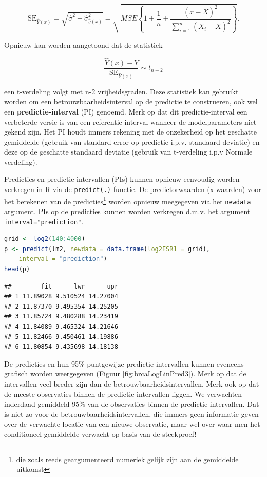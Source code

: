 \documentclass[
  12pt,dutch,coursenotes]{book}
\newcommand{\passthrough}[1]{#1}
\begin{document}
\[\text{SE}_{\hat{Y}(x)}=\sqrt{\hat\sigma^2+\hat\sigma^2_{\hat{g}(x)}}=\sqrt{MSE\left\{1+\frac{1}{n}+\frac{(x-\bar X)^2}{\sum\limits_{i=1}^n (X_i-\bar X)^2}\right\}}.\]

Opnieuw kan worden aangetoond dat de statistiek

\[\frac{\hat{Y}(x)-Y}{\text{SE}_{\hat{Y}(x)}}\sim t_{n-2}\]

een t-verdeling volgt met n-2 vrijheidsgraden.
Deze statistiek kan gebruikt worden om een betrouwbaarheidsinterval op de predictie te construeren, ook wel een \textbf{predictie-interval} (PI) genoemd.
Merk op dat dit predictie-interval een verbeterde versie is van een referentie-interval wanneer de modelparameters niet gekend zijn. Het PI houdt immers rekening met de onzekerheid op het geschatte gemiddelde (gebruik van standard error op predictie i.p.v. standaard deviatie) en deze op de geschatte standaard deviatie (gebruik van t-verdeling i.p.v Normale verdeling).

Predicties en predictie-intervallen (PIs) kunnen opnieuw eenvoudig worden verkregen in R via de \passthrough{\lstinline!predict(.)!} functie.
De predictorwaarden (x-waarden) voor het berekenen van de predicties\footnote{die zoals reeds geargumenteerd numeriek gelijk zijn aan de gemiddelde uitkomst} worden opnieuw meegegeven via het \passthrough{\lstinline!newdata!} argument.
PIs op de predicties kunnen worden verkregen d.m.v. het argument \passthrough{\lstinline!interval="prediction"!}.

\begin{lstlisting}[language=R]
grid <- log2(140:4000)
p <- predict(lm2, newdata = data.frame(log2ESR1 = grid),
    interval = "prediction")
head(p)
\end{lstlisting}

\begin{lstlisting}
##        fit      lwr      upr
## 1 11.89028 9.510524 14.27004
## 2 11.87370 9.495354 14.25205
## 3 11.85724 9.480288 14.23419
## 4 11.84089 9.465324 14.21646
## 5 11.82466 9.450461 14.19886
## 6 11.80854 9.435698 14.18138
\end{lstlisting}

De predicties en hun 95\% puntgewijze predictie-intervallen kunnen eveneens grafisch worden weergegeven (Figuur \ref{fig:brcaLogLinPred3}).
Merk op dat de intervallen veel breder zijn dan de betrouwbaarheidsintervallen.
Merk ook op dat de meeste observaties binnen de predictie-intervallen liggen.
We verwachten inderdaad gemiddeld 95\% van de observaties binnen de predictie-intervallen.
Dat is niet zo voor de betrouwbaarheidsintervallen, die immers geen informatie geven over de verwachte locatie van een nieuwe observatie, maar wel over waar men het conditioneel gemiddelde verwacht op basis van de steekproef!
\end{document}
